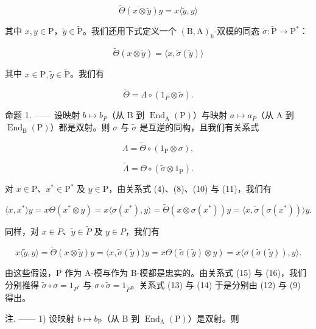 \[
\widetilde {\Theta} (x \otimes \widetilde {y}) y = x \langle \widetilde {y}, y \rangle\tag{10}
\]

其中 \(x, y \in \mathrm{P}\)，\(\widetilde{y} \in \widetilde{\mathrm{P}}\)。我们还用下式定义一个 \((\mathrm{B}, \mathrm{A})_k\)-双模的同态 \(\widetilde{\sigma}: \widetilde{\mathrm{P}} \to \mathrm{P}^*\)：

\[
\widetilde {\Theta} (x \otimes \widetilde {y}) = \langle x, \widetilde {\sigma} (\widetilde {y}) \rangle\tag{11}
\]

其中 \(x\in \mathrm{P},\widetilde{y}\in \widetilde{\mathrm{P}}\)。我们有

\[
\widetilde {\Theta} = \Lambda \circ (1 _ {P} \otimes \widetilde {\sigma}).\tag{12}
\]

命题 1. —— 设映射 \(b \mapsto b_{P}\)（从 B 到 \(\operatorname{End}_{\mathrm{A}}(\mathrm{P})\)）与映射 \(a \mapsto a_{P}\)（从 A 到 \(\operatorname{End}_{\mathrm{B}}(\mathrm{P})\)）都是双射。则 \(\sigma\) 与 \(\widetilde{\sigma}\) 是互逆的同构，且我们有关系式

\[
\Lambda = \widetilde {\Theta} \circ (1 _ {\mathrm{P}} \otimes \sigma),\tag{13}
\]

\[
\widetilde {\Lambda} = \Theta \circ (\widetilde {\sigma} \otimes 1 _ {\mathrm{P}}).\tag{14}
\]

对 \(x \in \mathrm{P}\)、\(x^{*} \in \mathrm{P}^{*}\) 及 \(y \in \mathrm{P}\)，由关系式 (4)、(8)、(10) 与 (11)，我们有

\[
\langle x, x ^ {*} \rangle y = x \Theta (x ^ {*} \otimes y) = x \langle \sigma (x ^ {*}), y \rangle = \widetilde {\Theta} (x \otimes \sigma (x ^ {*})) y = \langle x, \widetilde {\sigma} (\sigma (x ^ {*})) \rangle y.\tag{15}
\]

同样，对 \(x \in P\)、\(\widetilde{y} \in \widetilde{P}\) 及 \(y \in P\)，我们有

\[
x \langle \widetilde {y}, y \rangle = \widetilde {\Theta} (x \otimes \widetilde {y}) y = \langle x, \widetilde {\sigma} (\widetilde {y}) \rangle y = x \Theta (\widetilde {\sigma} (\widetilde {y}) \otimes y) = x \langle \sigma (\widetilde {\sigma} (\widetilde {y})), y \rangle .\tag{16}
\]

由这些假设，P 作为 A-模与作为 B-模都是忠实的。由关系式 (15) 与 (16)，我们分别推得 \(\widetilde{\sigma} \circ \sigma = 1_{P^{*}}\) 与 \(\sigma \circ \widetilde{\sigma} = 1_{\widetilde{P}}\)。关系式 (13) 与 (14) 于是分别由 (12) 与 (9) 得出。

注. —— 1) 设映射 \(b \mapsto b_{\mathrm{P}}\)（从 B 到 \(\operatorname{End}_{\mathrm{A}}(\mathrm{P})\)）是双射。则

